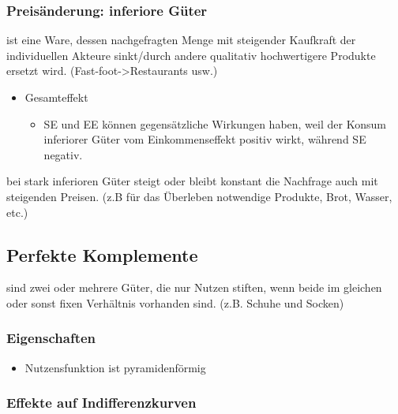 \subsubsection{Preisänderung: inferiore Güter}

\begin{definition}
     ist eine Ware, dessen nachgefragten Menge mit steigender Kaufkraft der individuellen Akteure sinkt/durch andere qualitativ hochwertigere Produkte ersetzt wird. (Fast-foot->Restaurants usw.)  
\end{definition}

\begin{itemize}
    \item Gesamteffekt
    \begin{itemize}
        \item SE und EE können gegensätzliche Wirkungen haben, weil der Konsum inferiorer Güter vom Einkommenseffekt positiv wirkt, während SE negativ. 
    \end{itemize}
\end{itemize}

\begin{definition}
    [Giffengüter] bei stark inferioren Güter steigt oder bleibt konstant die Nachfrage auch mit steigenden Preisen. (z.B für das Überleben notwendige Produkte, Brot, Wasser, etc.)
\end{definition}

\subsection{Perfekte Komplemente}

\begin{definition}
     sind zwei oder mehrere Güter, die nur Nutzen stiften, wenn beide im gleichen oder sonst fixen Verhältnis vorhanden sind. (z.B. Schuhe und Socken)
\end{definition}

\subsubsection{Eigenschaften}
\begin{itemize}
\item Nutzensfunktion ist pyramidenförmig
\end{itemize}

\subsubsection{Effekte auf Indifferenzkurven}

